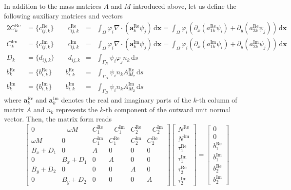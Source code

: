 \documentclass[11pt,a4paper]{article}
\begin{document}
In addition to the mass matrices $A$ and $M$ introduced above, let us define the following auxiliary matrices and vectors
\begin{alignat}{2}
C^\mathrm{Re}_k&=\{c^\mathrm{Re}_{ij,k}\} \qquad c^\mathrm{Re}_{ij,k}&=&
\int_\Omega \varphi_i\nabla\cdot(\mathbf{a}^\mathrm{Re}_k\psi_j)\,\mathrm{d}\mathbf{x}
=
\int_\Omega \varphi_i\left(\partial_x(a^\mathrm{Re}_{1k}\psi_i)+\partial_y(a^\mathrm{Re}_{2k}\psi_j)\right)\,\mathrm{d}\mathbf{x}\\
C^\mathrm{Im}_k&=\{c^\mathrm{Im}_{ij,k}\} \qquad c^\mathrm{Im}_{ij,k}&=&
\int_\Omega \varphi_i\nabla\cdot(\mathbf{a}^\mathrm{Im}_k\psi_j)\,\mathrm{d}\mathbf{x}
=
\int_\Omega \varphi_i\left(\partial_x(a^\mathrm{Im}_{1k}\psi_i)+\partial_y(a^\mathrm{Im}_{2k}\psi_j)\right)\,\mathrm{d}\mathbf{x}\\
D_k&=\{d_{ij,k}\} \qquad d_{ij,k}&=&
\int_{\Gamma_N}\psi_i\varphi_jn_k\,\mathrm{d}s\\
b^\mathrm{Re}_k&=\{b^\mathrm{Re}_{i,k}\} \qquad b^\mathrm{Re}_{i,k}&=&
\int_{\Gamma_D}\psi_in_kA^\mathrm{Re}_{M_2}\,\mathrm{d}s\\
b^\mathrm{Im}_k&=\{b^\mathrm{Im}_{i,k}\} \qquad b^\mathrm{Im}_{i,k}&=&
\int_{\Gamma_D}\psi_in_kA^\mathrm{Im}_{M_2}\,\mathrm{d}s
\end{alignat}
where $\mathbf{a}^\mathrm{Re}_k$ and $\mathbf{a}^\mathrm{Im}_k$ denotes the real and imaginary parts of the $k$-th column of matrix $A$ and $n_k$ represents the $k$-th component of the outward unit normal vector. Then, the matrix form reads
\begin{equation}
\begin{bmatrix}
0 & -\omega M & C_1^\mathrm{Re} & -C_1^\mathrm{Im} & C_2^\mathrm{Re} & -C_2^\mathrm{Im}\\[1ex]
\omega M & 0 & C_1^\mathrm{Im} & C_1^\mathrm{Re} & C_2^\mathrm{Im} & C_2^\mathrm{Re}\\[1ex]
B_x+D_1 & 0 & A & 0 & 0 & 0\\[1ex]
0 & B_x+D_1 & 0 & A & 0 & 0\\[1ex]
B_y+D_2 & 0 & 0 & 0 & A & 0\\[1ex]
0 & B_y+D_2 & 0 & 0 & 0 & A
\end{bmatrix}
\begin{bmatrix}
N^\mathrm{Re}\\[1ex]
N^\mathrm{Im}\\[1ex]
\tau_1^\mathrm{Re}\\[1ex]
\tau_1^\mathrm{Im}\\[1ex]
\tau_2^\mathrm{Re}\\[1ex]
\tau_2^\mathrm{Im}
\end{bmatrix}
=
\begin{bmatrix}
0\\[1ex]
0\\[1ex]
b_1^\mathrm{Re}\\[1ex]
b_1^\mathrm{Im}\\[1ex]
b_2^\mathrm{Re}\\[1ex]
b_2^\mathrm{Im}
\end{bmatrix}
\end{equation}
\end{document}
